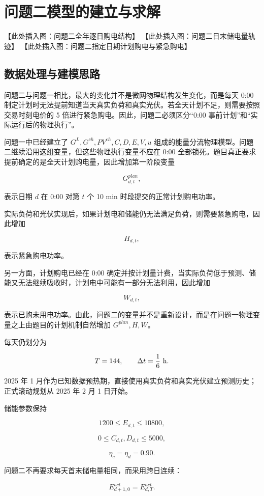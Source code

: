 \section{问题二模型的建立与求解}
【此处插入图：问题二全年逐日购电结构】
【此处插入图：问题二日末储电量轨迹】
【此处插入图：问题二指定日期计划购电与紧急购电】

\subsection{数据处理与建模思路}

问题二与问题一相比，最大的变化并不是微网物理结构发生变化，而是每天 0:00 制定计划时无法提前知道当天真实负荷和真实光伏。若全天计划不足，则需要按照交易时刻电价的 5 倍进行紧急购电。因此，问题二必须区分“0:00 事前计划”和“实际运行后的物理执行”。

问题一中已经建立了 \(G^L,G^{ch},PV^{ch},C,D,E,V,u\) 组成的能量分流物理模型。问题二继续沿用这组变量，但这些物理执行变量不应在 0:00 全部锁死。题目真正要求提前确定的是全天计划购电量，因此增加第一阶段变量

\[
G^{plan}_{d,t},
\]

表示日期 \(d\) 在 0:00 对第 \(t\) 个 10 min 时段提交的正常计划购电功率。

实际负荷和光伏实现后，如果计划电和储能仍无法满足负荷，则需要紧急购电，因此增加

\[
H_{d,t},
\]

表示紧急购电功率。

另一方面，计划购电已经在 0:00 确定并按计划量计费，当实际负荷低于预测、储能又无法继续吸收时，计划电中可能有一部分无法利用，因此增加

\[
W_{d,t},
\]

表示已购未用电功率。由此，问题二的变量并不是重新设计，而是在问题一物理变量之上由题目的计划机制自然增加 \(G^{plan},H,W\)。

每天仍划分为

\[
T=144,\qquad \Delta t=\frac16\ {\rm h}.
\]

2025 年 1 月作为已知数据预热期，直接使用真实负荷和真实光伏建立预测历史；正式滚动规划从 2025 年 2 月 1 日开始。

储能参数保持

\[
1200\le E_{d,t}\le10800,
\]

\[
0\le C_{d,t},D_{d,t}\le5000,
\]

\[
\eta_c=\eta_d=0.90.
\]

问题二不再要求每天首末储电量相同，而采用跨日连续：

\begin{equation}
E^{act}_{d+1,0}=E^{act}_{d,T}.
\end{equation}

